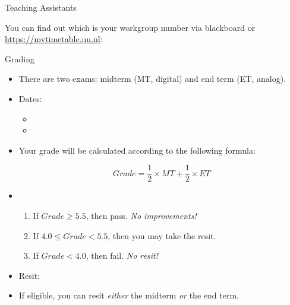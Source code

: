 \begin{frame}{Teaching Assistants}

You can find out which is your workgroup number via blackboard or \url{https://mytimetable.uu.nl}:
{\small \begin{center}
\TAS
\end{center}}


\end{frame}

\begin{frame}{Grading}

	\begin{itemize}[<+->]

		\item There are two exams: midterm (MT, digital) and end term (ET, analog).

		\item Dates:

					\begin{itemize}
						\item \Tussentoets
						\item \Eindtoets
					\end{itemize}

		\item Your grade will be calculated according to the following formula:

			\[Grade=\frac{1}{2}\times MT+\frac{1}{2}\times ET\]

		\item \begin{enumerate}[<+->]

				\item If $Grade\geq 5.5$, then pass. \emph{No improvements!}

				\item If $4.0\leq Grade<5.5$, then you may take the resit.

				\item If $Grade<4.0$, then fail. \emph{No resit!}

			\end{enumerate}

		\item Resit: \Herkansing

		\item If eligible, you can resit \emph{either} the midterm \emph{or} the end term.

	\end{itemize}

\end{frame}

